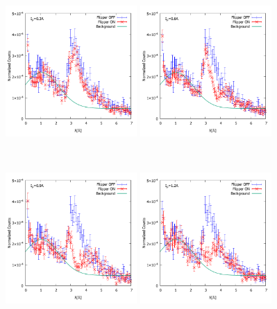\begin{figure}[h]
\begin{minipage}{0.33\hsize}
\end{minipage}
\begin{minipage}{0.33\hsize}
\includegraphics[width=5cm]{discussion/NC/NormalizedCounts_3A.pdf}
\end{minipage}
\begin{minipage}{0.33\hsize}
\includegraphics[width=5cm]{discussion/NC/NormalizedCounts_6A.pdf}
\end{minipage}\\
\begin{minipage}{0.33\hsize}
\includegraphics[width=5cm]{discussion/NC/NormalizedCounts_9A.pdf}
\end{minipage}
\begin{minipage}{0.33\hsize}
\includegraphics[width=5cm]{discussion/NC/NormalizedCounts_12A.pdf}

\end{minipage}
\end{figure}
